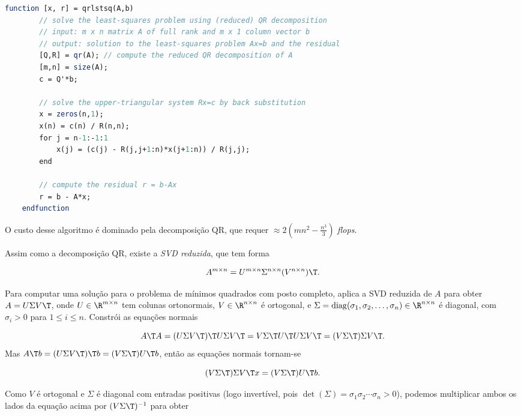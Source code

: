 \documentclass{article}
\DeclareMathOperator{\diag}{diag}
\begin{document}
\begin{lstlisting}[language=Scilab, caption=Resolvendo o problema de mínimos quadrados usando a decomposição QR]
    function [x, r] = qrlstsq(A,b)
        // solve the least-squares problem using (reduced) QR decomposition
        // input: m x n matrix A of full rank and m x 1 column vector b
        // output: solution to the least-squares problem Ax=b and the residual
        [Q,R] = qr(A); // compute the reduced QR decomposition of A
        [m,n] = size(A);
        c = Q'*b;
        
        // solve the upper-triangular system Rx=c by back substitution
        x = zeros(n,1);
        x(n) = c(n) / R(n,n);
        for j = n-1:-1:1
            x(j) = (c(j) - R(j,j+1:n)*x(j+1:n)) / R(j,j);
        end
        
        // compute the residual r = b-Ax
        r = b - A*x;
    endfunction
\end{lstlisting}

O custo desse algoritmo é dominado pela decomposição QR, que requer \(\approx 2\left(mn^2 - \frac{n^3}{3}\right)\) \emph{flops}.

Assim como a decomposição QR, existe a \emph{SVD reduzida}, que tem forma

\begin{equation}
    A^{m \times n} = U^{m \times n} \Sigma^{n \times n} (V^{n \times n})\T .
\end{equation}

Para computar uma solução para o problema de mínimos quadrados com posto completo, aplica a SVD reduzida de \(A\) para obter \(A = U \Sigma V\T \), onde \(U \in \R^{m \times n}\) tem colunas ortonormais, \(V \in \R^{n \times n}\) é ortogonal, e \(\Sigma = \diag(\sigma_1, \sigma_2, \ldots, \sigma_n) \in \R^{n \times n}\) é diagonal, com \(\sigma_i > 0\) para \(1 \leq i \leq n\). Constrói as equações normais

\[
    A\T A = (U \Sigma V\T )\T  U \Sigma V\T  = V \Sigma\T  U\T  U \Sigma V\T  = (V \Sigma\T ) \Sigma V\T .
\] Mas \(A\T b = (U \Sigma V\T )\T  b = (V \Sigma\T ) U\T  b\), então as equações normais tornam-se

\begin{equation}
    (V \Sigma\T ) \Sigma V\T  x = (V \Sigma\T ) U\T  b.
\end{equation}

Como \(V\) é ortogonal e \(\Sigma\) é diagonal com entradas positivas (logo invertível, pois \(\det(\Sigma) = \sigma_1 \sigma_2 \cdots \sigma_n > 0\)), podemos multiplicar ambos os lados da equação acima por \((V \Sigma\T )^{-1}\) para obter
\end{document}
